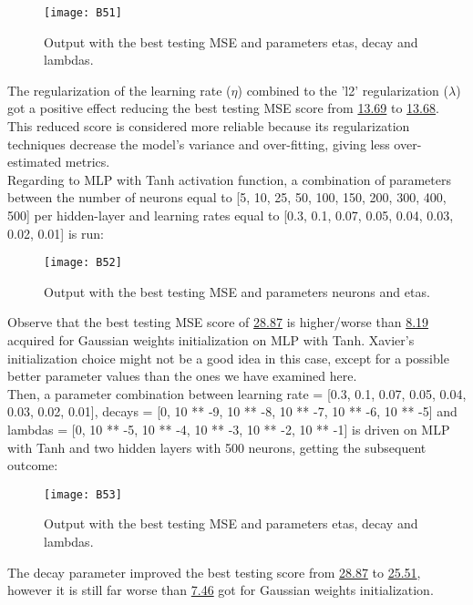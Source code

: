 \begin{figure}[H]
\label{fig:B33}
\centering
\texttt{[image: B51]}
\caption{Output with the best testing MSE and parameters etas, decay and lambdas.}
\end{figure}

The regularization of the learning rate ($\eta$) combined to the 'l2' regularization ($\lambda$) got a positive effect reducing the best testing MSE score from \hyperref[fig:B32]{13.69} to \hyperref[fig:B33]{13.68}. This reduced score is considered more reliable because its regularization techniques decrease the model's variance and over-fitting, giving less over-estimated metrics.\\

Regarding to MLP with Tanh activation function, a combination of parameters between the number of neurons equal to [5, 10, 25, 50, 100, 150, 200, 300, 400, 500] per hidden-layer and learning rates equal to [0.3, 0.1, 0.07, 0.05, 0.04, 0.03, 0.02, 0.01] is run:

\begin{figure}[H]
\label{fig:B32}
\centering
\texttt{[image: B52]}
\caption{Output with the best testing MSE and parameters neurons and etas.}
\end{figure}

Observe that the best testing MSE score of \hyperref[fig:B32]{28.87} is higher/worse than \hyperref[fig:B18]{8.19} acquired for Gaussian weights initialization on MLP with Tanh. Xavier's initialization choice might not be a good idea in this case, except for a possible better parameter values than the ones we have examined here.\\

Then, a parameter combination between learning rate = [0.3, 0.1, 0.07, 0.05, 0.04, 0.03, 0.02, 0.01], decays = [0, 10 ** -9, 10 ** -8, 10 ** -7, 10 ** -6, 10 ** -5] and lambdas = [0, 10 ** -5, 10 ** -4, 10 ** -3, 10 ** -2, 10 ** -1] is driven on MLP with Tanh and two hidden layers with 500 neurons, getting the subsequent outcome:

\begin{figure}[H]
\label{fig:B33}
\centering
\texttt{[image: B53]}
\caption{Output with the best testing MSE and parameters etas, decay and lambdas.}
\end{figure}

The decay parameter improved the best testing score from \hyperref[fig:B32]{28.87} to \hyperref[fig:B33]{25.51}, however it is still far worse than \hyperref[fig:B23]{7.46} got for Gaussian weights initialization.\\

